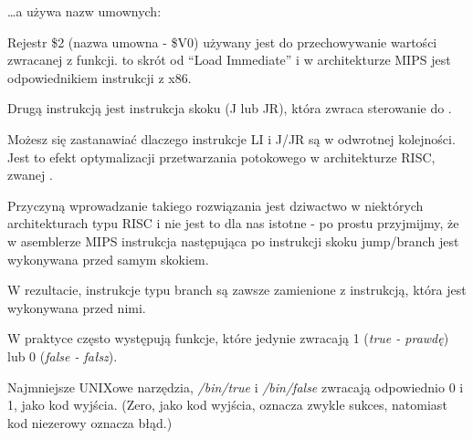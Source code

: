 \dots a \IDA używa nazw umownych:



Rejestr \$2 (nazwa umowna - \$V0) używany jest do przechowywanie wartości zwracanej z funkcji.
 to skrót od ``Load Immediate'' i w architekturze MIPS jest odpowiednikiem instrukcji \MOV z x86.

Drugą instrukcją jest instrukcja skoku (J lub JR), która zwraca sterowanie do .

Możesz się zastanawiać dlaczego instrukcje LI i J/JR są w odwrotnej kolejności.
Jest to efekt optymalizacji przetwarzania potokowego w architekturze \ac{RISC}, zwanej .

Przyczyną wprowadzanie takiego rozwiązania jest dziwactwo w niektórych architekturach typu RISC
i nie jest to dla nas istotne - po prostu przyjmijmy, że w asemblerze MIPS instrukcja następująca po instrukcji skoku jump/branch
jest wykonywana przed samym skokiem.

W rezultacie, instrukcje typu branch są zawsze zamienione z instrukcją, która jest wykonywana przed nimi.

W praktyce często występują funkcje, które jedynie zwracają 1 (\emph{true - prawdę}) lub 0 (\emph{false - fałsz}).

Najmniejsze UNIXowe narzędzia, \emph{/bin/true} i \emph{/bin/false} zwracają odpowiednio 0 i 1, jako kod wyjścia.
(Zero, jako kod wyjścia, oznacza zwykle sukces, natomiast kod niezerowy oznacza błąd.)
